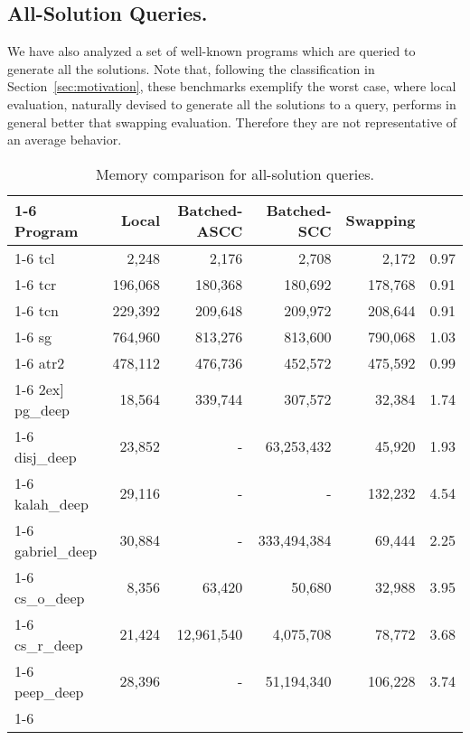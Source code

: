 \documentclass{./tlp}
\newcommand{\redsect}{\vspace{-1em}}
\begin{document}
\redsect
\subsection{All-Solution Queries.}
\label{sec:swapping-win}





We have also analyzed a set of well-known programs which are queried
to generate all the solutions.  
Note that, following the classification in
Section~\ref{sec:motivation}, these benchmarks exemplify the worst
case, where local evaluation, naturally devised to generate all the
solutions to a query, performs in general better that swapping
evaluation.  Therefore they are not representative of an average
behavior. 

\begin{table}[t] 
  \centering 
  \begin{tabular}{|l|r|r|r|r|c|} 
    \cline{1-6} 
    Program   & Local  & Batched-ASCC & Batched-SCC & Swapping & 
    \\\cline{1-6}
    tcl       & 2,248   & 2,176    & 2,708      & 2,172   & 0.97
    \\\cline{1-6}             
    tcr       & 196,068 & 180,368  & 180,692    & 178,768 & 0.91
    \\\cline{1-6}             
    tcn       & 229,392 & 209,648  & 209,972    & 208,644 & 0.91 
    \\\cline{1-6}             
    sg       & 764,960 & 813,276  & 813,600    & 790,068 & 1.03 
    \\\cline{1-6}             
    atr2      & 478,112 & 476,736  & 452,572    & 475,592 & 0.99 
    \\\cline{1-6}
    \multicolumn{6}{c}{}
    \-2ex]\cline{1-6}             
    pg\_deep      & 18,564  & 339,744  & 307,572    & 32,384 & 1.74  
    \\\cline{1-6} 
    disj\_deep    & 23,852  & -       & 63,253,432  & 45,920 & 1.93  
    \\\cline{1-6} 
    kalah\_deep   & 29,116  & -       & -         & 132,232  & 4.54
    \\\cline{1-6} 
    gabriel\_deep & 30,884  & -       & 333,494,384 & 69,444 & 2.25  
    \\\cline{1-6} 
    cs\_o\_deep   & 8,356   & 63,420   & 50,680     & 32,988 & 3.95  
    \\\cline{1-6} 
    cs\_r\_deep   & 21,424  & 12,961,540 & 4,075,708   & 78,772 & 3.68  
    \\\cline{1-6} 
    peep\_deep    & 28,396  & -       & 51,194,340  & 106,228 & 3.74   
\\\cline{1-6}                                                              
  \end{tabular} 
  \caption{Memory comparison for all-solution queries.} 
\label{tab:memory-comparison} 



\end{table}
\end{document}
